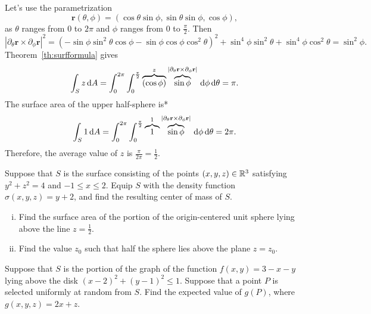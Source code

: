 \documentclass{watsonbook}
\begin{document}
\begin{solution}
  Let's use the parametrization 
  \[
    \mathbf{r}(\theta,\phi) =
    (\cos\theta\sin\phi,\sin\theta\sin\phi,\cos\phi), 
  \]
  as $\theta$ ranges from 0 to $2\pi$ and $\phi$ ranges from $0$ to
  $\frac{\pi}{2}$. Then 
  \[
    |\partial_\theta\mathbf{r} \times     \partial_\phi\mathbf{r} |^2=
    \left(- \sin{\phi} \sin^{2}{\theta
        } \cos{\phi} - \sin{\phi}
      \cos{\phi} \cos^{2}{\theta}\right)^{2} + \sin^{4}{\phi} \sin^{2}{\theta } + \sin^{4}{\phi}
    \cos^{2}{\theta } = \sin^2\phi. 
  \]
  Theorem~\ref{th:surfformula} gives 
  \[
    \int_S z \, \mathrm{d}{A} = \int_{0}^{2\pi} \int_{0}^{\frac{\pi}{2}}
    \overbrace{(\cos\phi)}^{z} \overbrace{\sin\phi}^{|\partial_\theta
      \mathbf{r}\times \partial_\phi \mathbf{r}|} \, \mathrm{d} \phi \, \mathrm{d}
    \theta = \pi. 
  \]
  The surface area of the upper half-sphere is* 
  \[
    \int_S 1 \, \mathrm{d}{A} = \int_{0}^{2\pi} \int_{0}^{\frac{\pi}{2}}
    \overbrace{1}^{1} \overbrace{\sin\phi}^{|\partial_\theta
      \mathbf{r}\times \partial_\phi \mathbf{r}|} \, \mathrm{d} \phi \, \mathrm{d}
    \theta = 2\pi. 
  \]
  Therefore, the average value of $z$ is
  $\displaystyle{\frac{\pi}{2\pi}} = \boxed{\frac{1}{2}}$. 
\end{solution}

\begin{exercise}{}{}
  Suppose that $S$ is the surface consisting of the points
  $(x,y,z) \in \mathbb{R}^3$ satisfying $y^2 + z^2 = 4$ and
  $-1 \leq x \leq 2$. Equip $S$ with the density function
  $\sigma(x,y,z) = y + 2$, and find the resulting center of mass of
  $S$.
\end{exercise}

\begin{exercise}{}{}
  \begin{enumerate}[(i),leftmargin=12pt]
  \item Find the surface area of the portion of the origin-centered
    unit sphere lying above the line $z = \frac{1}{2}$.
  \item Find the value $z_0$ such that half the sphere lies above the
    plane $z = z_0$. 
  \end{enumerate}
\end{exercise}

\begin{exercise}{}{}
  Suppose that $S$ is the portion of the graph of the function
  $f(x,y) = 3 - x - y$ lying above the disk
  $(x-2)^2 + (y-1)^2 \leq 1$. Suppose that a point $P$ is selected
  uniformly at random from $S$. Find the expected value of $g(P)$,
  where $g(x,y,z) = 2x + z$. 
\end{exercise}
\end{document}
